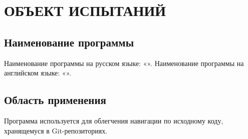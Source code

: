 \section{\uppercase{Объект испытаний}}

\subsection{Наименование программы}
    Наименование программы на русском языке: «\docTitle».
    Наименование программы на английском языке: «\docTitleEng».

\subsection{Область применения}
    Программа используется для облегчения навигации по исходному коду, хранящемуся в Git-репозиториях.

\clearpage
